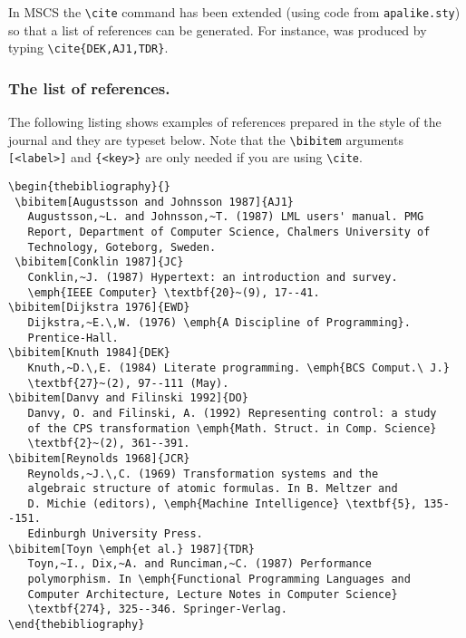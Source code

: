 \documentclass{mscs}
\begin{document}
In MSCS the \verb"\cite" command has been extended (using code from
\verb"apalike.sty") so that a list of references can be generated.
For instance, \cite{DEK,AJ1,TDR} was produced by typing
\verb"\cite{DEK,AJ1,TDR}".

\subsubsection{The list of references.}

The following listing shows examples of references
prepared in the style of the journal and they are
typeset below. Note that the \verb"\bibitem" arguments
\verb"[<label>]" and \verb"{<key>}" are only needed if
you are using \verb"\cite".
%
\begin{verbatim}
\begin{thebibliography}{}
 \bibitem[Augustsson and Johnsson 1987]{AJ1}
   Augustsson,~L. and Johnsson,~T. (1987) LML users' manual. PMG
   Report, Department of Computer Science, Chalmers University of
   Technology, Goteborg, Sweden.
 \bibitem[Conklin 1987]{JC}
   Conklin,~J. (1987) Hypertext: an introduction and survey.
   \emph{IEEE Computer} \textbf{20}~(9), 17--41.
\bibitem[Dijkstra 1976]{EWD}
   Dijkstra,~E.\,W. (1976) \emph{A Discipline of Programming}.
   Prentice-Hall.
\bibitem[Knuth 1984]{DEK}
   Knuth,~D.\,E. (1984) Literate programming. \emph{BCS Comput.\ J.}
   \textbf{27}~(2), 97--111 (May).
\bibitem[Danvy and Filinski 1992]{DO}
   Danvy, O. and Filinski, A. (1992) Representing control: a study
   of the CPS transformation \emph{Math. Struct. in Comp. Science}
   \textbf{2}~(2), 361--391.
\bibitem[Reynolds 1968]{JCR}
   Reynolds,~J.\,C. (1969) Transformation systems and the
   algebraic structure of atomic formulas. In B. Meltzer and
   D. Michie (editors), \emph{Machine Intelligence} \textbf{5}, 135--151.
   Edinburgh University Press.
\bibitem[Toyn \emph{et al.} 1987]{TDR}
   Toyn,~I., Dix,~A. and Runciman,~C. (1987) Performance
   polymorphism. In \emph{Functional Programming Languages and
   Computer Architecture, Lecture Notes in Computer Science}
   \textbf{274}, 325--346. Springer-Verlag.
\end{thebibliography}
\end{verbatim}
%
\end{document}
